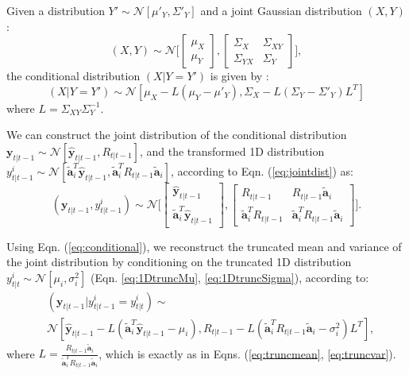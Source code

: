 
Given a distribution $Y' \sim \mathcal{N}[\mu'_Y, \Sigma'_Y]$ and a joint Gaussian distribution $(X,Y)$:
\begin{equation} \label{eq:jointdist}
(X, Y) \sim \mathcal{N}\Bigg[\begin{bmatrix} \mu_X \\ \mu_Y \end{bmatrix}, \begin{bmatrix} \Sigma_X & \Sigma_{XY} \\ \Sigma_{YX} & \Sigma_Y \end{bmatrix}\Bigg],
\end{equation}
the conditional distribution $(X | Y = Y')$ is given by \cite{Book:Rasmussen06}:
\begin{equation} \label{eq:conditional}
(X | Y = Y') \sim \mathcal{N}[\mu_X - L(\mu_Y - \mu'_Y), \Sigma_X - L(\Sigma_Y - \Sigma'_Y)L^T]
\end{equation}
where $L = \Sigma_{XY}\Sigma^{-1}_Y$.

We can construct the joint distribution of the conditional distribution $\mathbf{y}_{t|t-1} \sim \mathcal{N}[\hat{\mathbf{y}}_{t|t-1}, R_{t|t-1}]$, and the transformed 1D distribution $y^i_{t|t-1} \sim \mathcal{N}[\tilde{\mathbf{a}}_i^T\hat{\mathbf{y}}_{t|t-1}, \tilde{\mathbf{a}}_i^T R_{t|t-1} \tilde{\mathbf{a}}_i]$, according to Eqn. (\ref{eq:jointdist}) as:
\begin{equation}
(\mathbf{y}_{t|t-1}, y^i_{t|t-1}) \sim \mathcal{N}\Bigg[\begin{bmatrix} \hat{\mathbf{y}}_{t|t-1} \\ \tilde{\mathbf{a}}_i^T\hat{\mathbf{y}}_{t|t-1} \end{bmatrix}, \begin{bmatrix} R_{t|t-1} & R_{t|t-1} \tilde{\mathbf{a}}_i \\ \tilde{\mathbf{a}}_i^T R_{t|t-1} & \tilde{\mathbf{a}}_i^T R_{t|t-1} \tilde{\mathbf{a}}_i \end{bmatrix}\Bigg].
\end{equation}

Using Eqn. (\ref{eq:conditional}), we reconstruct the truncated mean and variance of the joint distribution by conditioning on the truncated 1D distribution $y^i_{t|t} \sim \mathcal{N}[\mu_i, \sigma_i^2]$ (Eqn. \ref{eq:1DtruncMu}, \ref{eq:1DtruncSigma}), according to:
\begin{align}
&(\mathbf{y}_{t|t-1} | y^i_{t|t-1} = y^i_{t|t}) \sim \nonumber \\
&\mathcal{N}[\hat{\mathbf{y}}_{t|t-1} - L(\tilde{\mathbf{a}}_i^T\hat{\mathbf{y}}_{t|t-1} - \mu_i), R_{t|t-1} - L(\tilde{\mathbf{a}}_i^T R_{t|t-1} \tilde{\mathbf{a}}_i - \sigma_i^2)L^T],
\end{align}
where $L = \frac{R_{t|t-1} \tilde{\mathbf{a}}_i}{ \tilde{\mathbf{a}}_i^T R_{t|t-1} \tilde{\mathbf{a}}_i}$, which is exactly as in Eqns. (\ref{eq:truncmean}, \ref{eq:truncvar}). 